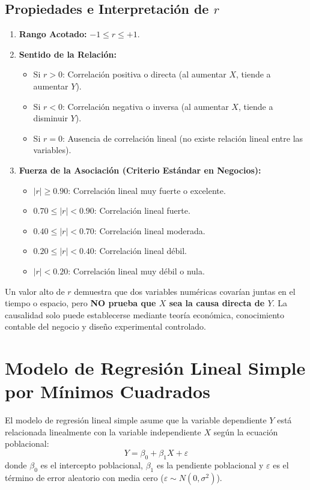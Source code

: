 \subsection{Propiedades e Interpretación de $r$}
\begin{enumerate}
    \item \textbf{Rango Acotado:} $-1 \le r \le +1$.
    \item \textbf{Sentido de la Relación:}
    \begin{itemize}
        \item Si $r > 0$: Correlación positiva o directa (al aumentar $X$, tiende a aumentar $Y$).
        \item Si $r < 0$: Correlación negativa o inversa (al aumentar $X$, tiende a disminuir $Y$).
        \item Si $r = 0$: Ausencia de correlación lineal (no existe relación lineal entre las variables).
    \end{itemize}
    \item \textbf{Fuerza de la Asociación (Criterio Estándar en Negocios):}
    \begin{itemize}
        \item $|r| \ge 0.90$: Correlación lineal muy fuerte o excelente.
        \item $0.70 \le |r| < 0.90$: Correlación lineal fuerte.
        \item $0.40 \le |r| < 0.70$: Correlación lineal moderada.
        \item $0.20 \le |r| < 0.40$: Correlación lineal débil.
        \item $|r| < 0.20$: Correlación lineal muy débil o nula.
    \end{itemize}
\end{enumerate}

\begin{alerta}
Un valor alto de $r$ demuestra que dos variables numéricas covarían juntas en el tiempo o espacio, pero \textbf{NO prueba que $X$ sea la causa directa de $Y$}. La causalidad solo puede establecerse mediante teoría económica, conocimiento contable del negocio y diseño experimental controlado.
\end{alerta}

\section{Modelo de Regresión Lineal Simple por Mínimos Cuadrados}
El modelo de regresión lineal simple asume que la variable dependiente $Y$ está relacionada linealmente con la variable independiente $X$ según la ecuación poblacional:
\begin{equation}
    Y = \beta_0 + \beta_1 X + \varepsilon
\end{equation}
donde $\beta_0$ es el intercepto poblacional, $\beta_1$ es la pendiente poblacional y $\varepsilon$ es el término de error aleatorio con media cero ($\varepsilon \sim N(0, \sigma^2)$).

